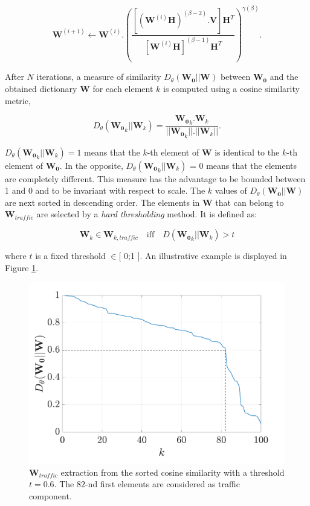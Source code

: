 \documentclass[twocolumn]{svjour3}          %
\begin{document}
\begin{equation}\label{eq:updateW_unsup}
\textbf{W}^{(i+1)} \leftarrow \mathbf{W}^{(i)}.\left(\frac{\left[\left(\mathbf{W}^{(i)}\mathbf{H} \right)^{(\beta-2)}.\mathbf{V} \right]\mathbf{H}^T}{\left[\mathbf{W}^{(i)}\mathbf{H} \right]^{(\beta-1)}\mathbf{H}^T}\right)^{\gamma(\beta)}.
\end{equation}

After $N$ iterations, a measure of similarity $D_{\theta}\left(\mathbf{W_0} \vert \vert \mathbf{W} \right)$ between $\mathbf{W_0}$ and the obtained dictionary $\mathbf{W}$ for each element $k$ is computed using a cosine similarity metric,

\begin{equation}
D_{\theta}\left(\mathbf{W_0}_k \vert \vert \mathbf{W}_k \right) = \frac{\mathbf{W_0}_k.\mathbf{W}_k}{\vert \vert \mathbf{W_0}_k  \vert \vert . \vert \vert \mathbf{W}_k \vert \vert}.
\end{equation}

$D_{\theta}\left(\mathbf{W_0}_k \vert \vert \mathbf{W}_k \right) = 1$ means that the $k$-th element of $\mathbf{W}$ is identical to the $k$-th element of $\mathbf{W_0}$. In the opposite, $D_{\theta}\left(\mathbf{W_0}_k \vert \vert \mathbf{W}_k \right)$ = 0 means that the elements are completely different. This measure has the advantage to be bounded between 1 and 0 and to be invariant with respect to scale. The $k$ values of $D_{\theta}\left(\mathbf{W_0} \vert \vert \mathbf{W} \right)$ are next sorted in descending order. The elements in $\mathbf{W}$ that can belong to $\mathbf{W}_{traffic}$ are selected by a \textit{hard thresholding} method. It is defined as:

\begin{equation}
\mathbf{W}_k \in \mathbf{W}_{k,traffic} \quad \text{iff} \quad D\left(\mathbf{W_0}_k \vert \vert \mathbf{W}_{k} \right) > t
\end{equation}

where $t$ is a fixed threshold $\in [$ 0;1 $]$.
An illustrative example is displayed in Figure \ref{fig:W_TI_NMF}.\\

\begin{figure}[hbtp]
\centering
\includegraphics[width=0.8\linewidth]{figures/distanceCosLinDisplay.pdf}
\caption{$\mathbf{W}_{traffic}$ extraction from the sorted cosine similarity with a threshold $t = 0.6$. The $82$-nd first elements are considered as traffic component.}
\label{fig:W_TI_NMF}
\end{figure}
\end{document}
